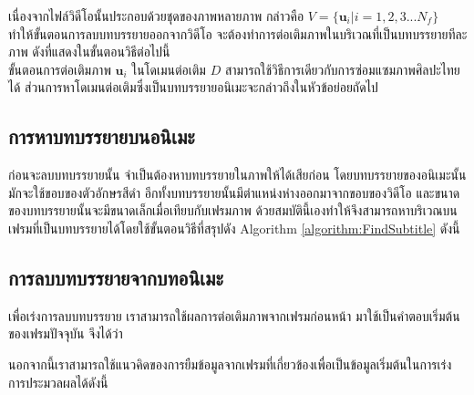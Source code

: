\hspace{1cm}เนื่องจากไฟล์วิดีโอนั้นประกอบด้วยชุดของภาพหลายภาพ กล่าวคือ $V = \{\boldsymbol{u}_i| i = 1,2,3 ... N_f\}$ ทำให้ขั้นตอนการลบบทบรรยายออกจากวิดีโอ จะต้องทำการต่อเติมภาพในบริเวณที่เป็นบทบรรยายทีละภาพ ดังที่แสดงในขั้นตอนวิธีต่อไปนี้ \\
	


\vspace{1cm}
\hspace{1cm} ขั้นตอนการต่อเติมภาพ $\boldsymbol{u}_i$ ในโดเมนต่อเติม $D$ สามารถใช้วิธีการเดียวกับการซ่อมแซมภาพศิลปะไทยได้ ส่วนการหาโดเมนต่อเติมซึ่งเป็นบทบรรยายอนิเมะจะกล่าวถึงในหัวข้อย่อยถัดไป

\subsection{การหาบทบรรยายบนอนิเมะ}	
\hspace{1cm}ก่อนจะลบบทบรรยายนั้น จำเป็นต้องหาบทบรรยายในภาพให้ได้เสียก่อน โดยบทบรรยายของอนิเมะนั้น มักจะใช้ขอบของตัวอักษรสีดำ อีกทั้งบทบรรยายนั้นมีตำแหน่งห่างออกมาจากขอบของวิดีโอ และขนาดของบทบรรยายนั้นจะมีขนาดเล็กเมื่อเทียบกับเฟรมภาพ ด้วยสมบัตินี้เองทำให้จึงสามารถหาบริเวณบนเฟรมที่เป็นบทบรรยายได้โดยใช้ขั้นตอนวิธีที่สรุปดัง Algorithm \ref{algorithm:FindSubtitle} ดังนี้
	
\vspace{1cm}



\subsection{การลบบทบรรยายจากบทอนิเมะ}

\hspace{1cm} เพื่อเร่งการลบบทบรรยาย เราสามารถใช้ผลการต่อเติมภาพจากเฟรมก่อนหน้า มาใช้เป็นคำตอบเริ่มต้นของเฟรมปัจจุบัน จึงได้ว่า\\
	
\vspace{0.5cm}

\vspace{0.5cm}



\vspace{0.5cm}	
\hspace{1cm} นอกจากนี้เราสามารถใช้แนวคิดของการยืมข้อมูลจากเฟรมที่เกี่ยวข้องเพื่อเป็นข้อมูลเริ่มต้นในการเร่งการประมวลผลได้ดังนี้ \\
	
\vspace{0.5cm}

 
\vspace{0.5cm}

\vspace{0.5cm}

\vspace{0.5cm}


